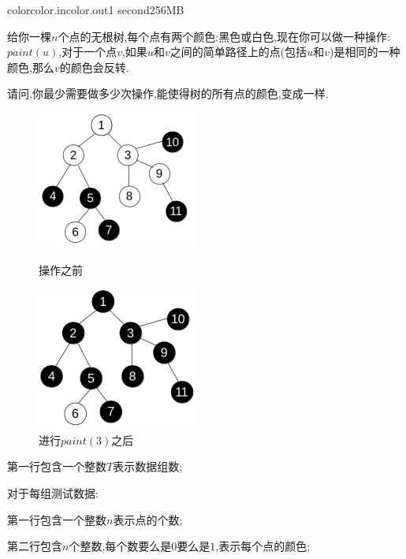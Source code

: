 \documentclass[11pt,a4paper,oneside]{article}
\begin{document}
\begin{problem}{color}{color.in}{color.out}{1 second}{256MB}

    给你一棵$n$个点的无根树,每个点有两个颜色:黑色或白色,现在你可以做一种操作:$paint(u)$,对于一个点$v$,如果$u$和$v$之间的简单路径上的点(包括$u$和$v$)是相同的一种颜色,那么$v$的颜色会反转. 
    
    请问,你最少需要做多少次操作,能使得树的所有点的颜色,变成一样.
    
    \begin{figure}[h!]
    	\centering
    	\begin{minipage}[c]{0.5\textwidth}	
    		\centering
    		\includegraphics[width=0.45\linewidth]{p1s1_1}	
    		\caption{操作之前}	
    	\end{minipage}%
    	\begin{minipage}[c]{0.5\textwidth}	
    		\centering
    		\includegraphics[width=0.45\linewidth]{p1s1_2}	
    		\caption{进行$paint(3)$之后}	
    	\end{minipage}%
    \end{figure}
    
    
    \InputFile
     
    第一行包含一个整数$T$表示数据组数;
    
    对于每组测试数据:

	第一行包含一个整数$n$表示点的个数;
	
	第二行包含$n$个整数,每个数要么是$0$要么是$1$,表示每个点的颜色;
	

\end{problem}
\end{document}
